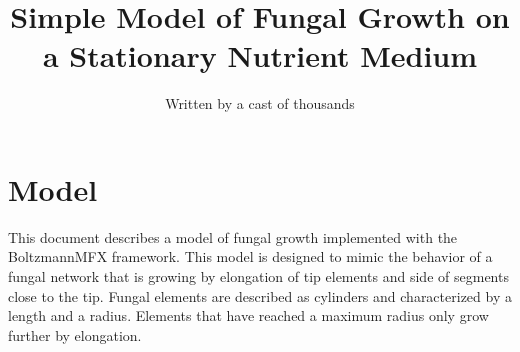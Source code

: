 \documentclass[12pt]{article}
\begin{document}
\newcommand{\dt}{\Delta t}
\newcommand{\Fvec}{\overline{F}}
\newcommand{\fvec}{\overline{f}}
\newcommand{\rvec}{\overline{r}}
\newcommand{\omvec}{\overline{\omega}}
\newcommand{\xvec}{\overline{x}}
\newcommand{\Xvec}{\overline{X}}
\newcommand{\yvec}{\overline{y}}
\newcommand{\Yvec}{\overline{Y}}
\newcommand{\Vvec}{\overline{V}}
\newcommand{\Rvec}{\overline{R}}
\newcommand{\Gvec}{\overline{G}}
\newcommand{\svec}{\overline{s}}
\newcommand{\Tvec}{\overline{T}}
\newcommand{\Lvec}{\overline{L}}
\newcommand{\vvec}{\overline{v}}
\newcommand{\nhat}{\hat{n}}
\newcommand{\rhvec}{\overline{\rho}}
\newcommand{\Dmat}{\overline{\overline{D}}}
\newcommand{\Rmat}{\overline{\overline{R}}}
\newcommand{\Omat}{\overline{\overline{1}}}
\newcommand{\Imat}{\overline{\overline{I}}}
\newcommand{\Hmat}{\overline{\overline{H}}}
\newcommand{\Lag}{\mathcal{L}}
\title{Simple Model of Fungal Growth on a Stationary Nutrient Medium}
\author{Written by a cast of thousands}
\maketitle

\renewcommand{\thetable}{\Roman{table}}

\section{Model}
This document describes a model of fungal growth implemented with the
BoltzmannMFX framework. This model is designed to mimic the behavior of a
fungal network that is growing by elongation of tip elements and side of
segments close to the tip. Fungal elements are described as cylinders and
characterized by a length and a radius. Elements that have reached a maximum
radius only grow further by elongation.
\end{document}
